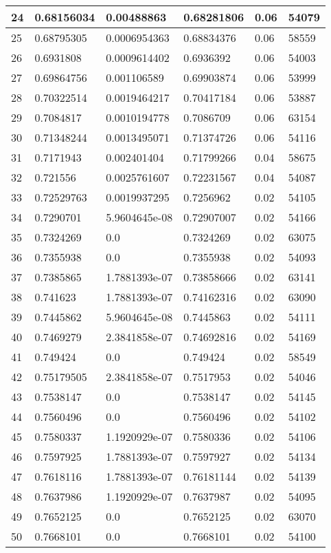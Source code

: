 \begin{longtable}{|l|l|l|l|l|l|}
24 & 0.68156034 & 0.00488863 & 0.68281806 & 0.06 & 54079 \\ \hline 
25 & 0.68795305 & 0.0006954363 & 0.68834376 & 0.06 & 58559 \\ \hline 
26 & 0.6931808 & 0.0009614402 & 0.6936392 & 0.06 & 54003 \\ \hline 
27 & 0.69864756 & 0.001106589 & 0.69903874 & 0.06 & 53999 \\ \hline 
28 & 0.70322514 & 0.0019464217 & 0.70417184 & 0.06 & 53887 \\ \hline 
29 & 0.7084817 & 0.0010194778 & 0.7086709 & 0.06 & 63154 \\ \hline 
30 & 0.71348244 & 0.0013495071 & 0.71374726 & 0.06 & 54116 \\ \hline 
31 & 0.7171943 & 0.002401404 & 0.71799266 & 0.04 & 58675 \\ \hline 
32 & 0.721556 & 0.0025761607 & 0.72231567 & 0.04 & 54087 \\ \hline 
33 & 0.72529763 & 0.0019937295 & 0.7256962 & 0.02 & 54105 \\ \hline 
34 & 0.7290701 & 5.9604645e-08 & 0.72907007 & 0.02 & 54166 \\ \hline 
35 & 0.7324269 & 0.0 & 0.7324269 & 0.02 & 63075 \\ \hline 
36 & 0.7355938 & 0.0 & 0.7355938 & 0.02 & 54093 \\ \hline 
37 & 0.7385865 & 1.7881393e-07 & 0.73858666 & 0.02 & 63141 \\ \hline 
38 & 0.741623 & 1.7881393e-07 & 0.74162316 & 0.02 & 63090 \\ \hline 
39 & 0.7445862 & 5.9604645e-08 & 0.7445863 & 0.02 & 54111 \\ \hline 
40 & 0.7469279 & 2.3841858e-07 & 0.74692816 & 0.02 & 54169 \\ \hline 
41 & 0.749424 & 0.0 & 0.749424 & 0.02 & 58549 \\ \hline 
42 & 0.75179505 & 2.3841858e-07 & 0.7517953 & 0.02 & 54046 \\ \hline 
43 & 0.7538147 & 0.0 & 0.7538147 & 0.02 & 54145 \\ \hline 
44 & 0.7560496 & 0.0 & 0.7560496 & 0.02 & 54102 \\ \hline 
45 & 0.7580337 & 1.1920929e-07 & 0.7580336 & 0.02 & 54106 \\ \hline 
46 & 0.7597925 & 1.7881393e-07 & 0.7597927 & 0.02 & 54134 \\ \hline 
47 & 0.7618116 & 1.7881393e-07 & 0.76181144 & 0.02 & 54139 \\ \hline 
48 & 0.7637986 & 1.1920929e-07 & 0.7637987 & 0.02 & 54095 \\ \hline 
49 & 0.7652125 & 0.0 & 0.7652125 & 0.02 & 63070 \\ \hline 
50 & 0.7668101 & 0.0 & 0.7668101 & 0.02 & 54100 \\ \hline 
\end{longtable}
